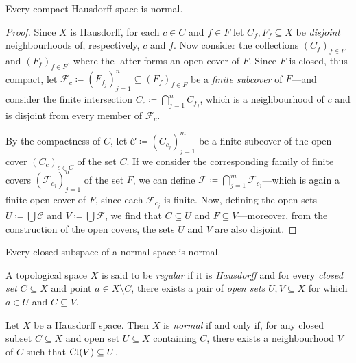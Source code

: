 \begin{proposition}
    \label{prop:compact-hausdorff-is-normal}
    Every compact Hausdorff space is normal.
\end{proposition}

\begin{proof}
    Since \(X\) is Hausdorff, for each \(c \in C\) and \(f \in F\) let
    \(C_f, F_f \subseteq X\) be \emph{disjoint} neighbourhoods of, respectively,
    \(c\) and \(f\). Now consider the collections \((C_f)_{f \in F}\) and
    \((F_f)_{f \in F}\), where the latter forms an open cover of \(F\). Since
    \(F\) is closed, thus compact, let
    \(\mathcal{F}_c \coloneq (F_{f_j})_{j=1}^n \subseteq (F_f)_{f \in F}\) be a
    \emph{finite subcover} of \(F\)---and consider the finite intersection
    \(C_c \coloneq \bigcap_{j=1}^n C_{f_j}\), which is a neighbourhood of \(c\) and
    is disjoint from every member of \(\mathcal{F}_c\).

    By the compactness of \(C\), let \(\mathcal{C} \coloneq (C_{c_j})_{j=1}^m\) be a
    finite subcover of the open cover \((C_c)_{c \in C}\) of the set \(C\). If we
    consider the corresponding family of finite covers
    \((\mathcal{F}_{c_j})_{j=1}^n\) of the set \(F\), we can define
    \(\mathcal{F} \coloneq \bigcap_{j=1}^m \mathcal{F}_{c_j}\)---which is again a
    finite open cover of \(F\), since each \(\mathcal{F}_{c_j}\) is finite. Now,
    defining the open sets \(U \coloneq \bigcup \mathcal{C}\) and
    \(V \coloneq \bigcup \mathcal{F}\), we find that \(C \subseteq U\) and
    \(F \subseteq V\)---moreover, from the construction of the open covers, the
    sets \(U\) and \(V\) are also disjoint.
\end{proof}

\begin{corollary}
    \label{cor:closed-subspace-is-normal}
    Every closed subspace of a normal space is normal.
\end{corollary}

\begin{definition}
    \label{def:regular-space}
    A topological space \(X\) is said to be \emph{regular} if it is \emph{Hausdorff}
    and for every \emph{closed set} \(C \subseteq X\) and point \(a \in X \setminus
    C\), there exists a pair of \emph{open sets} \(U, V \subseteq X\) for which \(a
    \in U\) and \(C \subseteq V\).
\end{definition}

\begin{lemma}
    \label{lem:equivalent-definition-normal-space}
    Let \(X\) be a Hausdorff space. Then \(X\) is \emph{normal} if and only if, for
    any closed subset \(C \subseteq X\) and open set \(U \subseteq X\) containing
    \(C\), there exists a neighbourhood \(V\) of \(C\) such that
    \(\operatorname{Cl}(V) \subseteq U\).
\end{lemma}

